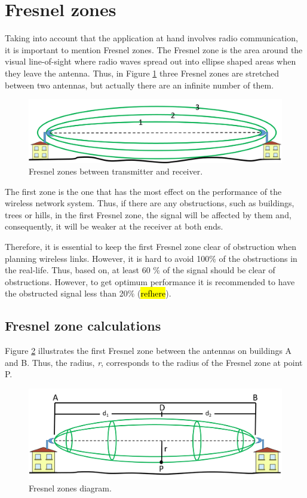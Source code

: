 \section{Fresnel zones}\label{sec:fresnel}
Taking into account that the application at hand involves radio communication, it is important to mention Fresnel zones. The Fresnel zone is the area around the visual line-of-sight where radio waves spread out into ellipse shaped areas when they leave the antenna. Thus, in Figure \ref{fig:3fresnel_zones} three Fresnel zones are stretched between two antennas, but actually there are an infinite number of them.

\begin{figure}[H]
	\centering
	\includegraphics[scale=0.65]{figures/fresnel_zones.png}
	\caption{Fresnel zones between transmitter and receiver.}
	\label{fig:3fresnel_zones}
\end{figure}

The first zone is the one that has the most effect on the performance of the wireless network system. Thus, if there are any obstructions, such as buildings, trees or hills, in the first Fresnel zone, the signal will be affected by them and, consequently, it will be weaker at the receiver at both ends.

Therefore, it is essential to keep the first Fresnel zone clear of obstruction when planning wireless links. However, it is hard to avoid 100$\%$ of the obstructions in the real-life. Thus, based on, at least 60 $\%$ of the signal should be clear of obstructions. However, to get optimum performance it is recommended to have the obstructed signal less than 20$\%$ \cite{proxim} (\hl{refhere}).

\subsection*{Fresnel zone calculations}
Figure \ref{fig:fresnel_zones} illustrates the first Fresnel zone between the antennas on buildings A and B. Thus, the radius, \textit{r}, corresponds to the radius of the Fresnel zone at point P. 

\begin{figure}[H]
	\centering
	\includegraphics[scale=0.60]{figures/fresnel_zone.png}
	\caption{Fresnel zones diagram.}
	\label{fig:fresnel_zones}
\end{figure} 

